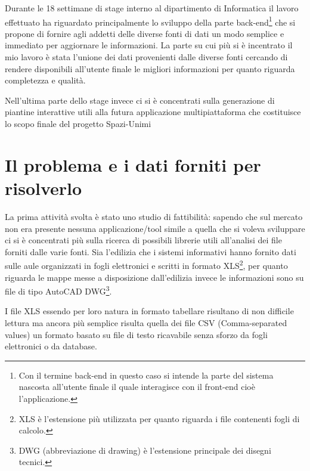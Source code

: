 \documentclass[12pt]{report}
\begin{document}
Durante le 18 settimane di stage interno al dipartimento di Informatica il lavoro effettuato ha riguardato principalmente lo sviluppo della parte back-end\footnote{Con il termine back-end in questo caso si intende la parte del sistema nascosta all'utente finale il quale interagisce con il front-end cioè l'applicazione.} che si propone di fornire agli addetti delle diverse fonti di dati un modo semplice e immediato per aggiornare le informazioni.
La parte su cui più si è incentrato il mio lavoro è stata l'unione dei dati provenienti dalle diverse fonti cercando di rendere disponibili all'utente finale le migliori informazioni per quanto riguarda completezza e qualità.

Nell'ultima parte dello stage invece ci si è concentrati sulla generazione di piantine interattive utili alla futura applicazione multipiattaforma che costituisce lo scopo finale del progetto Spazi-Unimi %


\newpage
\section{Il problema e i dati forniti per risolverlo}

La prima attività svolta è stato uno studio di fattibilità: sapendo che sul mercato non era presente nessuna applicazione/tool simile a quella che si voleva sviluppare ci si è concentrati più sulla ricerca di possibili librerie utili all'analisi dei file forniti dalle varie fonti. 
Sia l'edilizia che i sistemi informativi hanno fornito dati sulle aule organizzati in fogli elettronici e scritti in formato XLS\footnote{XLS è l'estensione più utilizzata per quanto riguarda i file contenenti fogli di calcolo.}, per quanto riguarda le mappe messe a disposizione dall'edilizia invece le informazioni sono su file di tipo AutoCAD DWG\footnote{DWG (abbreviazione di drawing) è l'estensione principale dei disegni tecnici.}. 

\vspace{5mm} %

I file XLS essendo per loro natura in formato tabellare risultano di non difficile lettura ma ancora più semplice risulta quella dei file CSV (Comma-separated values) un formato basato su file di testo ricavabile senza sforzo da fogli elettronici o da database. 
\end{document}
